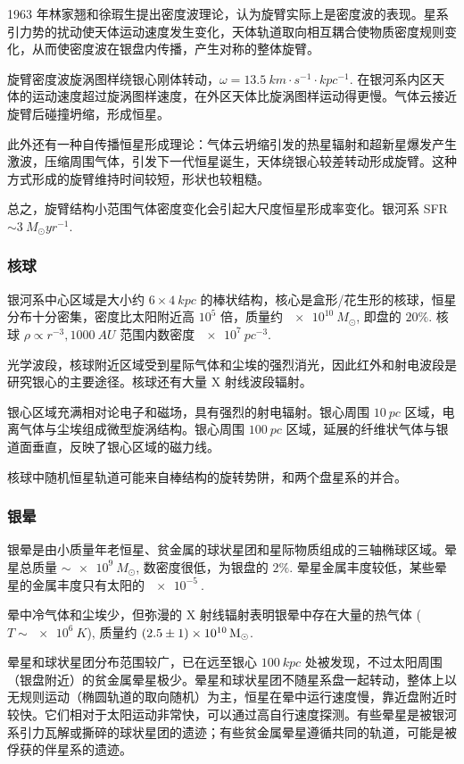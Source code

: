 \documentclass[../天体物理基础.tex]{subfiles}
\begin{document}
1963 年林家翘和徐瑕生提出密度波理论，认为旋臂实际上是密度波的表现。星系引力势的扰动使天体运动速度发生变化，天体轨道取向相互耦合使物质密度规则变化，从而使密度波在银盘内传播，产生对称的整体旋臂。

旋臂密度波旋涡图样绕银心刚体转动，$\omega=\qty{13.5}{km\cdot{}s^{-1}\cdot{}kpc^{-1}}$. 在银河系内区天体的运动速度超过旋涡图样速度，在外区天体比旋涡图样运动得更慢。气体云接近旋臂后碰撞坍缩，形成恒星。

此外还有一种自传播恒星形成理论：气体云坍缩引发的热星辐射和超新星爆发产生激波，压缩周围气体，引发下一代恒星诞生，天体绕银心较差转动形成旋臂。这种方式形成的旋臂维持时间较短，形状也较粗糙。

总之，旋臂结构小范围气体密度变化会引起大尺度恒星形成率变化。银河系 SFR$\sim\qty{3}{M_{\odot}yr^{-1}}$.

\subsubsection{核球}
银河系中心区域是大小约 $6\times\qty{4}{kpc}$ 的棒状结构，核心是盒形/花生形的核球，恒星分布十分密集，密度比太阳附近高 $10^{5}$ 倍，质量约 $\qty{e10}{M_{\odot}}$, 即盘的 $20\%$. 核球 $\rho\propto{}r^{-3},\qty{1000}{AU}$ 范围内数密度 $\qty{e7}{pc^{-3}}$.

光学波段，核球附近区域受到星际气体和尘埃的强烈消光，因此红外和射电波段是研究银心的主要途径。核球还有大量 X 射线波段辐射。

银心区域充满相对论电子和磁场，具有强烈的射电辐射。银心周围 $\qty{10}{pc}$ 区域，电离气体与尘埃组成微型旋涡结构。银心周围 $\qty{100}{pc}$ 区域，延展的纤维状气体与银道面垂直，反映了银心区域的磁力线。

核球中随机恒星轨道可能来自棒结构的旋转势阱，和两个盘星系的并合。

\subsubsection{银晕}
银晕是由小质量年老恒星、贫金属的球状星团和星际物质组成的三轴椭球区域。晕星总质量 $\sim\qty{e9}{M_{\odot}}$, 数密度很低，为银盘的 $2\%$. 晕星金属丰度较低，某些晕星的金属丰度只有太阳的 $\qty{e-5}{}$.

晕中冷气体和尘埃少，但弥漫的 X 射线辐射表明银晕中存在大量的热气体 ($T\sim\qty{e6}{K}$), 质量约 $\mleft(2.5\pm1\mright)\times\qty{e10}{M_{\odot}}$.

晕星和球状星团分布范围较广，已在远至银心 $\qty{100}{kpc}$ 处被发现，不过太阳周围（银盘附近）的贫金属晕星极少。晕星和球状星团不随星系盘一起转动，整体上以无规则运动（椭圆轨道的取向随机）为主，恒星在晕中运行速度慢，靠近盘附近时较快。它们相对于太阳运动非常快，可以通过高自行速度探测。有些晕星是被银河系引力瓦解或撕碎的球状星团的遗迹；有些贫金属晕星遵循共同的轨道，可能是被俘获的伴星系的遗迹。
\end{document}
